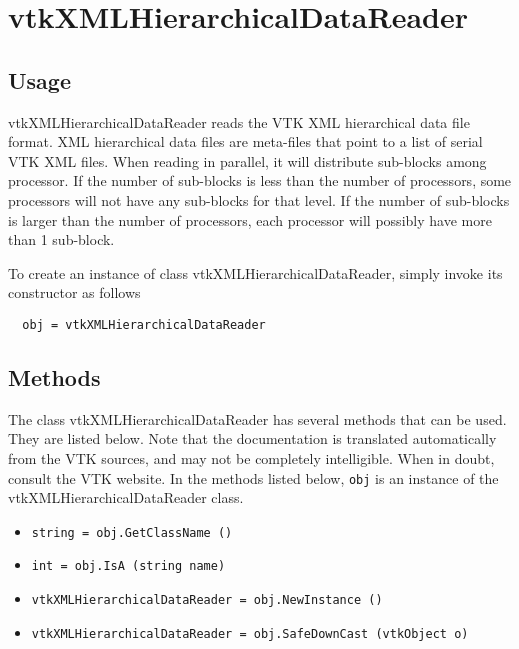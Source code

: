 \section{vtkXMLHierarchicalDataReader}

\subsection{Usage}

 vtkXMLHierarchicalDataReader reads the VTK XML hierarchical data file
 format. XML hierarchical data files are meta-files that point to a list
 of serial VTK XML files. When reading in parallel, it will distribute
 sub-blocks among processor. If the number of sub-blocks is less than
 the number of processors, some processors will not have any sub-blocks
 for that level. If the number of sub-blocks is larger than the
 number of processors, each processor will possibly have more than
 1 sub-block.

To create an instance of class vtkXMLHierarchicalDataReader, simply
invoke its constructor as follows
\begin{verbatim}
  obj = vtkXMLHierarchicalDataReader
\end{verbatim}
\subsection{Methods}

The class vtkXMLHierarchicalDataReader has several methods that can be used.
  They are listed below.
Note that the documentation is translated automatically from the VTK sources,
and may not be completely intelligible.  When in doubt, consult the VTK website.
In the methods listed below, \verb|obj| is an instance of the vtkXMLHierarchicalDataReader class.
\begin{itemize}
\item  \verb|string = obj.GetClassName ()|

\item  \verb|int = obj.IsA (string name)|

\item  \verb|vtkXMLHierarchicalDataReader = obj.NewInstance ()|

\item  \verb|vtkXMLHierarchicalDataReader = obj.SafeDownCast (vtkObject o)|

\end{itemize}
